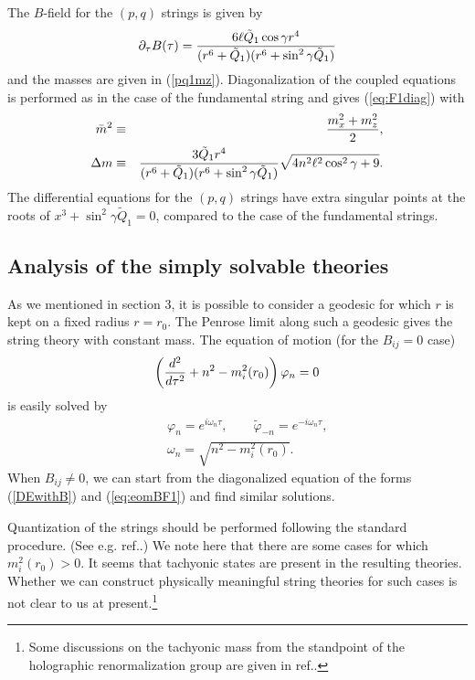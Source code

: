 \documentclass[a4paper,12pt]{article}
\begin{document}
The $B$-field for the $(p,q)$ strings is given by
\begin{equation}
\partial_\tau B(\tau)= 
{6\ell \tilde{Q}_1 \cos\gamma r^4 \over 
(r^6+\tilde{Q}_1)(r^6+\sin^2\gamma \tilde{Q}_1)}
\end{equation}
and the masses are given in (\ref{pq1mz}).
Diagonalization of the coupled equations is
performed as in the case of the fundamental
string and gives (\ref{eq:F1diag}) with
\begin{eqnarray}
\bar{m}^2&\equiv&{m_x^2+m_z^2\over 2}, \\
\Delta m&\equiv& {3 \tilde{Q}_1 r^4\over (r^6+\tilde{Q}_1) 
(r^6+\sin^2\gamma \tilde{Q}_1)}
\sqrt{4n^2\ell^2\cos^2\gamma+9}.
\end{eqnarray}
The differential equations for the $(p,q)$ strings have
extra singular points at the roots of $x^3+\sin^2\gamma 
\tilde{Q}_{1}=0$, compared to the case of the fundamental
strings. 


\subsection{Analysis of the simply solvable theories}
As we mentioned in section 3, it is possible to consider 
a geodesic for which $r$ is kept on a fixed radius $r=r_{0}$.
The Penrose limit along such a geodesic gives the string theory
with constant mass. 
The equation of motion (for the $B_{ij}=0$ case)
\begin{equation}
\left({d^2\over d\tau^2}+n^2-m_{i}^2(r_{0}) \right)\varphi_{n}=0
\end{equation}
is easily solved by 
\begin{eqnarray}
&&\varphi_{n}=e^{i\omega_{n}\tau},\qquad
\tilde{\varphi}_{-n}=e^{-i\omega_{n}\tau},\nonumber\\
&&\omega_{n}=\sqrt{n^2-m_{i}^2(r_{0})}.
\end{eqnarray}
When $B_{ij}\neq 0$, we can start from the diagonalized 
equation of the forms (\ref{DEwithB}) and (\ref{eq:eomBF1})
and find similar solutions.

Quantization of the strings should be performed following
the standard procedure. (See e.g. ref.\cite{MeTs}.)
We note here that there are some cases for which 
$m^{2}_{i}(r_{0})>0$. It seems that tachyonic states
are present in the resulting theories.
Whether we can construct 
physically meaningful string theories for such cases
is not clear to us at present.\footnote{Some discussions 
on the tachyonic mass from the standpoint 
of the holographic renormalization group  
are given in ref.\cite{GiPaSo}.}
\end{document}
